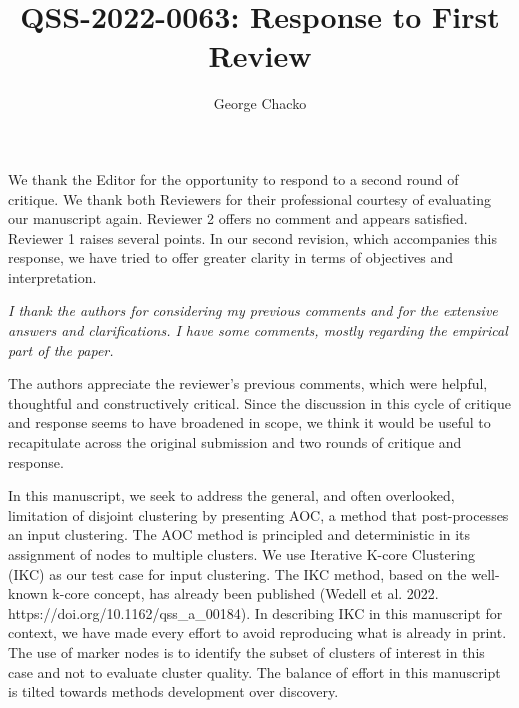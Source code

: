 \documentclass[11pt, oneside]{article}   	%
\title{QSS-2022-0063: Response to First Review}
\author{George Chacko}
\begin{document}
\maketitle
\section*{}

We thank the Editor for the opportunity to respond to a second round of critique. We thank both Reviewers for their professional courtesy of evaluating our manuscript again. Reviewer 2 offers no comment and appears satisfied. Reviewer 1 raises several points. In our second revision, which accompanies this response, we have tried to offer greater clarity in terms of objectives and interpretation.

 \vspace{2 mm} 
 \emph{I thank the authors for considering my previous comments and for the extensive answers and clarifications. I have some comments, mostly regarding the empirical part of the paper.} 
 
 \vspace{2 mm} 
The authors appreciate  the reviewer's previous comments, which were helpful, thoughtful and constructively critical. Since the discussion in this cycle of critique and response seems to have broadened in scope, we think it would be useful to recapitulate across the original submission and two rounds of critique and response.

 \vspace{2 mm} In this manuscript, we seek to address the general, and often overlooked, limitation of disjoint clustering by presenting AOC, a method that post-processes an input clustering. The AOC method is principled and deterministic in its assignment of nodes to multiple clusters. We use Iterative K-core Clustering (IKC) as our test case for input clustering. The IKC method, based on the well-known k-core concept, has already been published (Wedell et al. 2022. https://doi.org/10.1162/qss\_a\_00184). In describing IKC in this manuscript for context, we have made every effort to avoid reproducing what is already in print. The use of marker nodes is to identify the subset of clusters of interest in this case and not to evaluate cluster quality. The balance of effort in this manuscript is tilted towards methods development over discovery.
 
\end{document}

